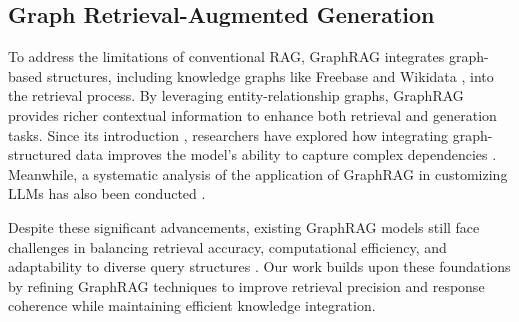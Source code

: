 \documentclass[11pt]{article}
\begin{document}
\subsection{Graph Retrieval-Augmented Generation}
To address the limitations of conventional RAG, GraphRAG integrates graph-based structures, including knowledge graphs like Freebase \cite{bollacker2008freebase} and Wikidata \cite{vrandevcic2014wikidata}, into the retrieval process. By leveraging entity-relationship graphs, GraphRAG provides richer contextual information to enhance both retrieval and generation tasks. 
Since its introduction \cite{edge2024local}, researchers have explored how integrating graph-structured data improves the model’s ability to capture complex dependencies \cite{han2024retrieval}. Meanwhile, a systematic analysis of the application of GraphRAG in customizing LLMs has also been conducted \cite{zhang2025survey}.

Despite these significant advancements, existing GraphRAG models still face challenges in balancing retrieval accuracy, computational efficiency, and adaptability to diverse query structures \citep{peng2024graph}. Our work builds upon these foundations by refining GraphRAG techniques to improve retrieval precision and response coherence while maintaining efficient knowledge integration.
\end{document}

